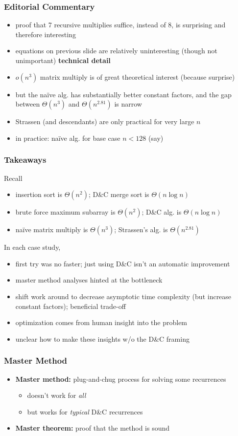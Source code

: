 \documentclass[10pt,aspectratio=169]{beamer}
\begin{document}
\begin{frame} \frametitle{Editorial Commentary}
\begin{itemize}
  \item proof that 7 recursive multiplies suffice, instead of 8, is surprising
    and therefore interesting
  \item equations on previous slide are relatively uninteresting (though not
    unimportant) \textbf{technical detail}
  \item $o(n^3)$ matrix multiply is of great theoretical interest (because
    surprise)
  \item but the na\"ive alg. has substantially better constant factors, and
    the gap between $\Theta(n^3)$ and $\Theta(n^{2.81})$ is narrow
  \item Strassen (and descendants) are only practical for very large $n$
  \item in practice: na\"ive alg. for base case $n<128$ (say)
\end{itemize}
\end{frame}

\begin{frame} \frametitle{Takeaways}
Recall
\begin{itemize}
  \item insertion sort is $\Theta(n^2)$; D\&C merge sort is $\Theta(n \log n)$
  \item brute force maximum subarray is $\Theta(n^2)$; D\&C alg. is $\Theta(n \log n)$
  \item na\"ive matrix multiply is $\Theta(n^3)$; Strassen's alg. is $\Theta(n^{2.81})$
\end{itemize}
In each case study,
\begin{itemize}
  \item first try was no faster; just using D\&C isn't an automatic improvement
  \item master method analyses hinted at the bottleneck
  \item shift work around to decrease asymptotic time complexity (but increase
    constant factors); beneficial trade-off
  \item optimization comes from human insight into the problem
  \item unclear how to make these insights w/o the D\&C framing
\end{itemize}
\end{frame}

\begin{frame} \frametitle{Master Method}
  \begin{itemize}
    \item \textbf{Master method:} plug-and-chug process for solving some recurrences
    \begin{itemize}
      \item doesn't work for \emph{all}
      \item but works for \emph{typical} D\&C recurrences
    \end{itemize}
  \item \textbf{Master theorem:} proof that the method is sound
  \end{itemize}
\end{frame}
\end{document}

